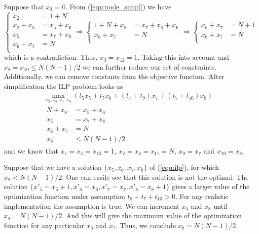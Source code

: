 \documentclass[12pt,a4paper,titlepage,oneside]{article}
\begin{document}
\begin{itemize}
Suppose that $x_3 = 0$.
From (\ref{equ:node_simpl}) we have
\begin{equation*}
	\left\{\begin{aligned}
		x_2			&= 1 + N\\
		x_2 + x_8	&= x_5 + x_6\\
		x_5			&= x_7 + x_8\\
		x_6 + x_7	&= N\\
	\end{aligned}\right.
\Rightarrow
	\left\{\begin{aligned}
		1 + N + x_8	&= x_7 + x_8 + x_6\\
		x_6 + x_7	&= N\\
	\end{aligned}\right.
\Rightarrow
	\left\{\begin{aligned}
		x_6 + x_7 	&= N+1\\
		x_6 + x_7	&= N\\
	\end{aligned}\right.
\end{equation*}
which is a contradiction.
Thus, $x_3 = x_{12} = 1$.
Taking this into account and $x_8 = x_{10} \leq N(N-1)/2$ we can further reduce our set of constraints.
Additionally, we can remove constants from the objective function.
After simplification the ILP problem looks as
\begin{equation}
\begin{aligned}
	\max_{x_5, x_6, x_7, x_8} \left(t_5 x_5 + t_5 x_6 + (t_7+t_9)x_7 + (t_7+t_{10}) x_8 \right)\\
	\left.\begin{aligned}
		N + x_8		&= x_5 + x_6\\
		x_5			&= x_7 + x_8\\
		x_6 + x_7	&= N\\
		x_8			&\leq N(N-1)/2
	\end{aligned}\right.
\end{aligned}
\label{equ:ilp}
\end{equation}
and we know that $x_1 = x_3 = x_{12} = 1$, $x_2 = x_4 = x_{11} = N$, $x_9 = x_7$ and $x_{10} = x_8$.

Suppose that we have a solution $\{x_5, x_6, x_7, x_8\}$ of (\ref{equ:ilp}), for which $x_8 < N(N-1)/2$.
One can easily see that this solution is not the optimal.
The solution $\{x'_5 = x_5+1, x'_6 = x_6, x'_7 = x_7, x'_8 = x_8+1\}$ gives a larger value of the optimization function under assumption $t_5 + t_7 + t_{10} > 0$.
For any realistic implementation the assumption is true.
We can increment $x_5$ and $x_8$ until $x_8 = N(N-1)/2$.
And this will give the maximum value of the optimization function for any particular $x_6$ and $x_7$.
Thus, we conclude $x_8 = N(N-1)/2$.


\end{itemize}
\end{document}
